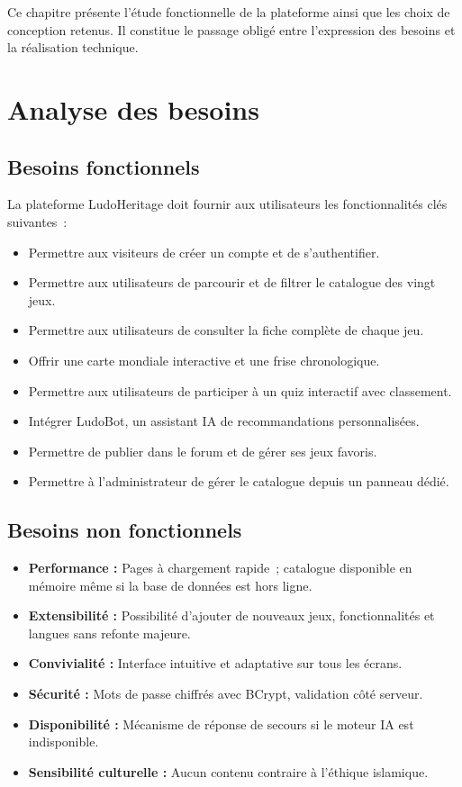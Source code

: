 \documentclass[12pt,a4paper]{report}
\begin{document}
Ce chapitre présente l'étude fonctionnelle de la plateforme ainsi que les choix de
conception retenus. Il constitue le passage obligé entre l'expression des besoins et
la réalisation technique.

\section{Analyse des besoins}

\subsection{Besoins fonctionnels}

La plateforme LudoHeritage doit fournir aux utilisateurs les fonctionnalités clés
suivantes~:

\begin{itemize}[leftmargin=2cm]
  \item Permettre aux visiteurs de créer un compte et de s'authentifier.
  \item Permettre aux utilisateurs de parcourir et de filtrer le catalogue des vingt jeux.
  \item Permettre aux utilisateurs de consulter la fiche complète de chaque jeu.
  \item Offrir une carte mondiale interactive et une frise chronologique.
  \item Permettre aux utilisateurs de participer à un quiz interactif avec classement.
  \item Intégrer LudoBot, un assistant IA de recommandations personnalisées.
  \item Permettre de publier dans le forum et de gérer ses jeux favoris.
  \item Permettre à l'administrateur de gérer le catalogue depuis un panneau dédié.
\end{itemize}

\subsection{Besoins non fonctionnels}

\begin{itemize}[leftmargin=2cm]
  \item \textbf{Performance :} Pages à chargement rapide~; catalogue disponible en mémoire même si la base de données est hors ligne.
  \item \textbf{Extensibilité :} Possibilité d'ajouter de nouveaux jeux, fonctionnalités et langues sans refonte majeure.
  \item \textbf{Convivialité :} Interface intuitive et adaptative sur tous les écrans.
  \item \textbf{Sécurité :} Mots de passe chiffrés avec BCrypt, validation côté serveur.
  \item \textbf{Disponibilité :} Mécanisme de réponse de secours si le moteur IA est indisponible.
  \item \textbf{Sensibilité culturelle :} Aucun contenu contraire à l'éthique islamique.
\end{itemize}
\end{document}

